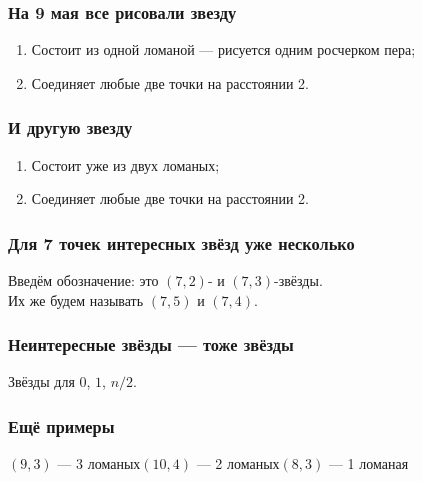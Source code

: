 \begin{frame} \frametitle{На 9 мая все рисовали звезду}
     \begin{center}  \end{center}
     \pause
     \begin{enumerate}
	\item Состоит из одной ломаной — рисуется одним росчерком пера;
	\item Соединяет любые две точки на расстоянии 2.
     \end{enumerate}
\end{frame}

\begin{frame} \frametitle{И другую звезду}
     \begin{center}  \end{center}
     \begin{enumerate}
	\item Состоит уже из двух ломаных;
	\item Соединяет любые две точки на расстоянии 2.
     \end{enumerate}
\end{frame}

\begin{frame} \frametitle{Для 7 точек интересных звёзд уже несколько}
     \begin{center}  \end{center}
     \pause
     Введём обозначение: это $(7,2)$- и $(7,3)$-звёзды.\\ Их же будем называть $(7,5)$ и $(7,4)$.
\end{frame}

\begin{frame} \frametitle{Неинтересные звёзды — тоже звёзды}
     \begin{center}  \end{center}
     \begin{center} Звёзды для $0$, $1$, $n / 2$. \end{center}
\end{frame}

\begin{frame} \frametitle{Ещё примеры}
     \begin{center}  \end{center}
     \begin{center}$(9,3)$ — 3 ломаных\qquad $(10,4)$ — 2 ломаных\qquad $(8,3)$ — 1 ломаная\end{center}
\end{frame}

